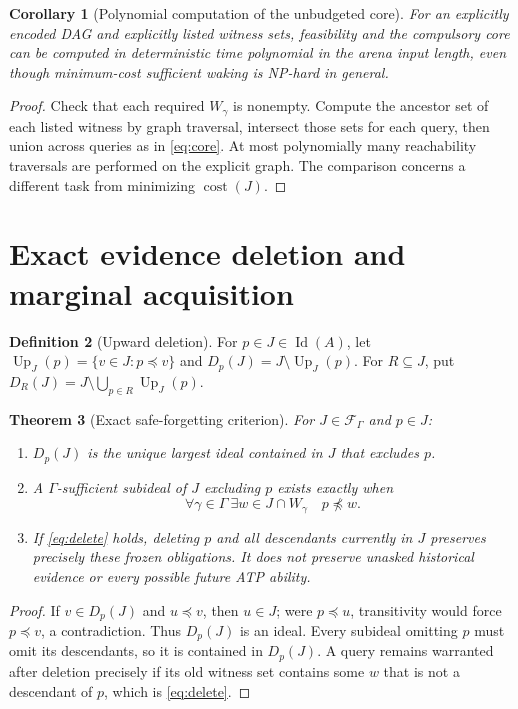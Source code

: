 \documentclass[10pt,letterpaper]{article}
\newtheorem{theorem}{Theorem}[section]
\newtheorem{corollary}[theorem]{Corollary}
\theoremstyle{definition}
\newtheorem{definition}[theorem]{Definition}
\theoremstyle{remark}
\newcommand{\cost}{\operatorname{cost}}
\newcommand{\Id}{\operatorname{Id}}
\newcommand{\Up}{\operatorname{Up}}
\begin{document}
\begin{corollary}[Polynomial computation of the unbudgeted core]
For an explicitly encoded DAG and explicitly listed witness sets, feasibility and the compulsory core can be computed in deterministic time polynomial in the arena input length, even though minimum-cost sufficient waking is NP-hard in general.
\end{corollary}
\begin{proof}
Check that each required $W_\gamma$ is nonempty. Compute the ancestor set of each listed witness by graph traversal, intersect those sets for each query, then union across queries as in \eqref{eq:core}. At most polynomially many reachability traversals are performed on the explicit graph. The comparison concerns a different task from minimizing $\cost(J)$.
\end{proof}

\section{Exact evidence deletion and marginal acquisition}\label{gl-first-W2-s5}
\begin{definition}[Upward deletion]
For $p\in J\in\Id(A)$, let $\Up_J(p)=\{v\in J:p\preceq v\}$ and $D_p(J)=J\setminus\Up_J(p)$. For $R\subseteq J$, put $D_R(J)=J\setminus\bigcup_{p\in R}\Up_J(p)$.
\end{definition}

\begin{theorem}[Exact safe-forgetting criterion]\label{thm:delete}
For $J\in\mathcal F_\Gamma$ and $p\in J$:
\begin{enumerate}[label=(\roman*)]
\item $D_p(J)$ is the unique largest ideal contained in $J$ that excludes $p$.
\item A $\Gamma$-sufficient subideal of $J$ excluding $p$ exists exactly when
\begin{equation}\label{eq:delete}
\forall\gamma\in\Gamma\ \exists w\in J\cap W_\gamma\quad p\not\preceq w.
\end{equation}
\item If \eqref{eq:delete} holds, deleting $p$ and all descendants currently in $J$ preserves precisely these frozen obligations. It does not preserve unasked historical evidence or every possible future ATP ability.
\end{enumerate}
\end{theorem}
\begin{proof}
If $v\in D_p(J)$ and $u\preceq v$, then $u\in J$; were $p\preceq u$, transitivity would force $p\preceq v$, a contradiction. Thus $D_p(J)$ is an ideal. Every subideal omitting $p$ must omit its descendants, so it is contained in $D_p(J)$. A query remains warranted after deletion precisely if its old witness set contains some $w$ that is not a descendant of $p$, which is \eqref{eq:delete}.\end{proof}
\end{document}
